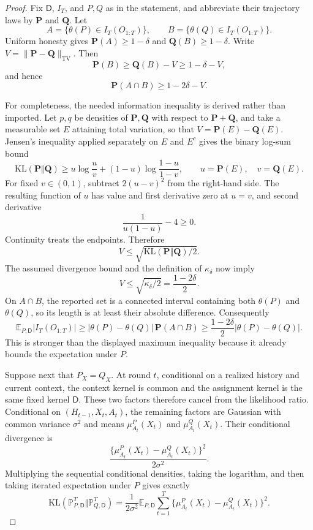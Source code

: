 \documentclass{article}
\begin{document}
\begin{proof}
Fix \(\mathsf D\), \(I_T\), and \(P,Q\) as in the statement, and abbreviate their trajectory laws by \(\mathbf P\) and \(\mathbf Q\).  Let
\[
A=\{\theta(P)\in I_T(O_{1:T})\},
\qquad
B=\{\theta(Q)\in I_T(O_{1:T})\}.
\]
Uniform honesty gives \(\mathbf P(A)\geq1-\delta\) and \(\mathbf Q(B)\geq1-\delta\).  Write \(V=\|\mathbf P-\mathbf Q\|_{\mathrm{TV}}\).  Then
\[
\mathbf P(B)\geq\mathbf Q(B)-V\geq1-\delta-V,
\]
and hence
\[
\mathbf P(A\cap B)\geq1-2\delta-V.
\]

For completeness, the needed information inequality is derived rather than imported.  Let \(p,q\) be densities of \(\mathbf P,\mathbf Q\) with respect to \(\mathbf P+\mathbf Q\), and take a measurable set \(E\) attaining total variation, so that \(V=\mathbf P(E)-\mathbf Q(E)\).  Jensen's inequality applied separately on \(E\) and \(E^c\) gives the binary log-sum bound
\[
\mathrm{KL}(\mathbf P\Vert\mathbf Q)
\geq u\log\frac uv+(1-u)\log\frac{1-u}{1-v},
\qquad
u=\mathbf P(E),\quad v=\mathbf Q(E).
\]
For fixed \(v\in(0,1)\), subtract \(2(u-v)^2\) from the right-hand side.  The resulting function of \(u\) has value and first derivative zero at \(u=v\), and second derivative
\[
\frac{1}{u(1-u)}-4\geq0.
\]
Continuity treats the endpoints.  Therefore
\[
V\leq\sqrt{\mathrm{KL}(\mathbf P\Vert\mathbf Q)/2}.
\]
The assumed divergence bound and the definition of \(\kappa_\delta\) now imply
\[
V\leq\sqrt{\kappa_\delta/2}=\frac{1-2\delta}{2}.
\]
On \(A\cap B\), the reported set is a connected interval containing both \(\theta(P)\) and \(\theta(Q)\), so its length is at least their absolute difference.  Consequently
\[
\mathbb E_{P,\mathsf D}|I_T(O_{1:T})|
\geq |\theta(P)-\theta(Q)|\,\mathbf P(A\cap B)
\geq\frac{1-2\delta}{2}|\theta(P)-\theta(Q)|.
\]
This is stronger than the displayed maximum inequality because it already bounds the expectation under \(P\).

Suppose next that \(P_X=Q_X\).  At round \(t\), conditional on a realized history and current context, the context kernel is common and the assignment kernel is the same fixed kernel \(\mathsf D\).  These two factors therefore cancel from the likelihood ratio.  Conditional on \((H_{t-1},X_t,A_t)\), the remaining factors are Gaussian with common variance \(\sigma^2\) and means \(\mu_{A_t}^P(X_t)\) and \(\mu_{A_t}^Q(X_t)\).  Their conditional divergence is
\[
\frac{\{\mu_{A_t}^P(X_t)-\mu_{A_t}^Q(X_t)\}^2}{2\sigma^2}.
\]
Multiplying the sequential conditional densities, taking the logarithm, and then taking iterated expectation under \(P\) gives exactly
\[
\mathrm{KL}(\mathbb P_{P,\mathsf D}^{T}\Vert\mathbb P_{Q,\mathsf D}^{T})
=\frac{1}{2\sigma^2}\mathbb E_{P,\mathsf D}
\sum_{t=1}^T\{\mu_{A_t}^P(X_t)-\mu_{A_t}^Q(X_t)\}^2.
\]


\end{proof}
\end{document}
